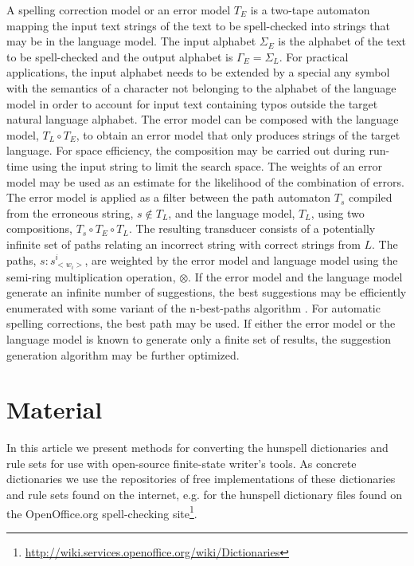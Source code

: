 \documentclass[a4paper,runningheads]{llncs}
\begin{document}
A spelling correction model or an error model $T_E$ is a two-tape
automaton mapping the input text strings of the text to be
spell-checked into strings that may be in the language model. The
input alphabet $\Sigma_E$ is the alphabet of the text to be
spell-checked and the output alphabet is $\Gamma_E = \Sigma_L$. For
practical applications, the input alphabet needs to be extended by a
special any symbol with the semantics of a character not belonging to
the alphabet of the language model in order to account for input text
containing typos outside the target natural language alphabet. The
error model can be composed with the language model, $T_L \circ T_E$,
to obtain an error model that only produces strings of the target
language. For space efficiency, the composition may be carried out
during run-time using the input string to limit the search space. The
weights of an error model may be used as an estimate for the likelihood of the
combination of errors. The error model is applied as a filter between
the path automaton $T_s$ compiled from the erroneous string, $s \notin
T_L$, and the language model, $T_L$, using two compositions, $T_s
\circ T_E \circ T_L$. The resulting transducer consists of a
potentially infinite set of paths relating an incorrect string with
correct strings from $L$. The paths, $s:s^i_{<w_i>}$, are weighted by
the error model and language model using the semi-ring multiplication
operation, $\otimes$. If the error model and the language model
generate an infinite number of suggestions, the best suggestions may
be efficiently enumerated with some variant of the n-best-paths
algorithm \cite{mohri/2002}. For automatic spelling corrections, the
best path may be used. If either the error model or the language model
is known to generate only a finite set of results, the suggestion
generation algorithm may be further optimized.

\section{Material}
\label{sec:material}

In this article we present methods for converting the hunspell 
dictionaries and rule sets for use with open-source finite-state
writer's tools.  As concrete dictionaries we use the repositories of
free implementations of these dictionaries and rule sets found on the
internet, e.g. for the hunspell dictionary files found on the
OpenOffice.org spell-checking
site\footnote{\url{http://wiki.services.openoffice.org/wiki/Dictionaries}}.
\end{document}
